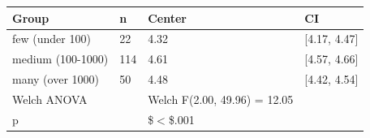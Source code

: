 \begin{table}[ht]
\centering
\begingroup\footnotesize
\begin{tabular}{llll}
  \toprule
Group & n & Center & CI \\ 
  \midrule
few (under 100) & 22 & 4.32 & [4.17, 4.47] \\ 
  medium (100-1000) & 114 & 4.61 & [4.57, 4.66] \\ 
  many (over 1000) & 50 & 4.48 & [4.42, 4.54] \\ 
  Welch ANOVA &  & Welch F(2.00, 49.96) = 12.05 &  \\ 
  p &  & \$$<$\$.001 &  \\ 
   \bottomrule
\end{tabular}
\endgroup
\end{table}
